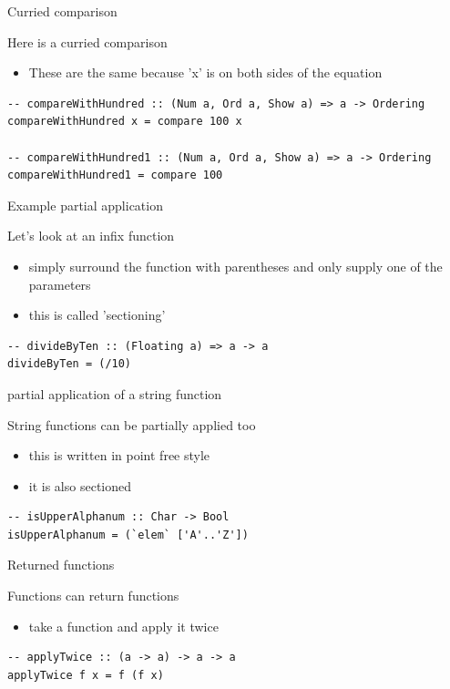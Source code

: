 \documentclass[presetation]{beamer}
\begin{document}
\begin{frame}[fragile,label={sec:orgfb11fa3}]{Curried comparison}
 \begin{block}{Here is a curried comparison}
\begin{itemize}
\item These are the same because 'x' is on both sides of the equation
\end{itemize}
\begin{verbatim}
-- compareWithHundred :: (Num a, Ord a, Show a) => a -> Ordering  
compareWithHundred x = compare 100 x  

-- compareWithHundred1 :: (Num a, Ord a, Show a) => a -> Ordering  
compareWithHundred1 = compare 100  
\end{verbatim}
\end{block}
\end{frame}

\begin{frame}[fragile,label={sec:orgfd64a4d}]{Example partial application}
 \begin{block}{Let's look at an infix function}
\begin{itemize}
\item simply surround the function with parentheses and only supply one of
the parameters
\item this is called 'sectioning'
\end{itemize}
\begin{verbatim}
-- divideByTen :: (Floating a) => a -> a
divideByTen = (/10)
\end{verbatim}
\end{block}
\end{frame}

\begin{frame}[fragile,label={sec:org975fc72}]{partial application of a string function}
 \begin{block}{String functions can be partially applied too}
\begin{itemize}
\item this is written in point free style
\item it is also sectioned
\end{itemize}
\begin{verbatim}
-- isUpperAlphanum :: Char -> Bool
isUpperAlphanum = (`elem` ['A'..'Z'])
\end{verbatim}
\end{block}
\end{frame}


\begin{frame}[fragile,label={sec:orgdff85db}]{Returned functions}
 \begin{block}{Functions can return functions}
\begin{itemize}
\item take a function and apply it twice
\end{itemize}
\begin{verbatim}
-- applyTwice :: (a -> a) -> a -> a
applyTwice f x = f (f x)
\end{verbatim}
\end{block}
\end{frame}
\end{document}
